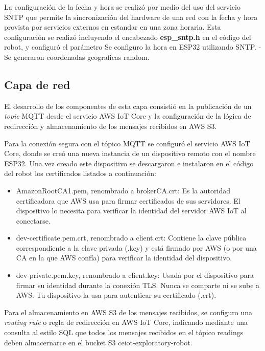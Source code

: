 La configuración de la fecha y hora se realizó por medio del uso del servicio SNTP \citep{sntp} que permite la sincronización del hardware de una red con la fecha y hora provista por servicios externos en estandar en una zona horaria. Esta configuración se realizó incluyendo el encabezado \textbf{esp_sntp.h} en el código del robot, y configuró el parámetro  Se configuro la hora en ESP32 utilizando SNTP.
- Se generaron coordenadas geograficas random.

\subsection{Capa de red}

El desarrollo de los componentes de esta capa consistió en la publicación de un \textit{topic} MQTT desde el servicio AWS IoT Core y la configuración de la lógica de redirección y almacenamiento de los mensajes recibidos en AWS S3.


Para la conexión segura con el tópico MQTT se configuró el servicio AWS IoT Core, donde se creó una nueva instancia de un dispositivo remoto con el nombre ESP32. Una vez creado este dispositivo se descargaron e instalaron en el código del robot los certificados listados a continuación:


\begin{itemize}
	\item AmazonRootCA1.pem, renombrado a brokerCA.crt:	Es la autoridad certificadora que AWS usa para firmar certificados de sus servidores. El dispositivo lo necesita para verificar la identidad del servidor AWS IoT al conectarse.
	\item dev-certificate.pem.crt, renombrado a client.crt: Contiene la clave pública correspondiente a la clave privada (.key) y está firmado por AWS (o por una CA en la que AWS confía) para verificar la identidad del dispositivo.
	\item dev-private.pem.key, renombrado a client.key: Usada por el dispositivo para firmar su identidad durante la conexión TLS. Nunca se comparte ni se sube a AWS. Tu dispositivo la usa para autenticar su certificado (.crt).
		
\end{itemize}


Para el almacenamiento en AWS S3 de los mensajes recibidos, se configuro una \textit{routing rule} o regla de redirección en AWS IoT Core, indicando mediante una consulta al estilo SQL que todos los mensajes recibidos en el tópico readings deben almacernarce en el bucket S3 ceiot-exploratory-robot.
 



